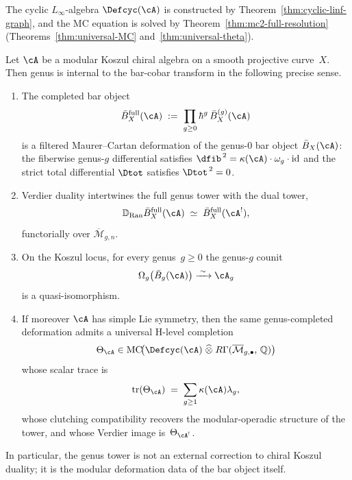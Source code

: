 \begin{definition}
\smallskip\noindent
The cyclic $L_\infty$-algebra $\Defcyc(\cA)$ is constructed
by Theorem~\ref{thm:cyclic-linf-graph}, and the MC equation
is solved by Theorem~\ref{thm:mc2-full-resolution}
(Theorems~\ref{thm:universal-MC}
and~\ref{thm:universal-theta}).
\end{definition}

\begin{theorem}
\label{thm:genus-internalization}
Let $\cA$ be a modular Koszul chiral algebra on a smooth projective
curve~$X$.  Then genus is internal to the bar-cobar transform in the
following precise sense.
\begin{enumerate}[label=\textup{(\roman*)}]
\item The completed bar object
  \[
  \bar{B}^{\mathrm{full}}_X(\cA)
  \;:=\;
  \prod_{g \geq 0}\hbar^g\,\bar{B}^{(g)}_X(\cA)
  \]
  is a filtered Maurer--Cartan deformation of the genus-$0$ bar object
  $\bar{B}_X(\cA)$: the fiberwise genus-$g$ differential satisfies
  $\dfib^{\,2} = \kappa(\cA)\cdot\omega_g\cdot\operatorname{id}$ and the
  strict total differential $\Dtot$ satisfies $\Dtot^{\,2} = 0$.
\item Verdier duality intertwines the full genus tower with the dual
  tower,
  \[
  \mathbb{D}_{\operatorname{Ran}}\bar{B}^{\mathrm{full}}_X(\cA)
  \;\simeq\;
  \bar{B}^{\mathrm{full}}_X(\cA^!),
  \]
  functorially over $\overline{\mathcal{M}}_{g,n}$.
\item On the Koszul locus, for every genus~$g \geq 0$ the genus-$g$
  counit
  \[
  \Omega_g\bigl(\bar{B}_g(\cA)\bigr)
  \xrightarrow{\;\sim\;}
  \cA_g
  \]
  is a quasi-isomorphism.
\item If moreover $\cA$ has simple Lie symmetry, then the same
  genus-completed deformation admits a universal H-level completion
  \[
  \Theta_{\cA} \in
  \operatorname{MC}\!\bigl(
    \Defcyc(\cA) \;\widehat{\otimes}\;
    R\Gamma(\overline{\mathcal{M}}_{g,\bullet},\, \mathbb{Q})
  \bigr)
  \]
  whose scalar trace is
  \[
  \operatorname{tr}(\Theta_{\cA})
  \;=\;
  \sum_{g \geq 1} \kappa(\cA)\lambda_g,
  \]
  whose clutching compatibility recovers the modular-operadic structure
  of the tower, and whose Verdier image is~$\Theta_{\cA^!}$.
\end{enumerate}
In particular, the genus tower is not an external correction to chiral
Koszul duality; it is the modular deformation data of the bar object
itself.
\end{theorem}


